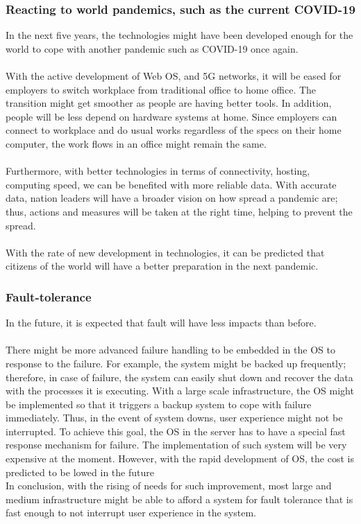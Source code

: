 \subsubsection{Reacting to world pandemics, such as the current COVID-19 }

In the next five years, the technologies might have been developed enough for the world to cope with another pandemic such as COVID-19 once again. \\
\\
With the active development of Web OS, and 5G networks, it will be eased for employers to switch workplace from traditional office to home office.
The transition might get smoother as people are having better tools.
In addition, people will be less depend on hardware systems at home. 
Since employers can connect to workplace and do usual works regardless of the specs on their home computer, the work flows in an office might remain the same. \\
\\
Furthermore, with better technologies in terms of connectivity, hosting, computing speed, we can be benefited with more reliable data. 
With accurate data, nation leaders will have a broader vision on how spread a pandemic are; thus, actions and measures will be taken at the right time, helping to prevent the spread. \\
\\
With the rate of new development in technologies, it can be predicted that citizens of the world will have a better preparation in the next pandemic.

\subsubsection{Fault-tolerance}

In the future, it is expected that fault will have less impacts than before. \\
\\
There might be more advanced failure handling to be embedded in the OS to response to the failure.
For example, the system might be backed up frequently; therefore, in case of failure, the system can easily shut down and recover the data with the processes it is executing.
With a large scale infrastructure, the OS might be implemented so that it triggers a backup system to cope with failure immediately.
Thus, in the event of system downs, user experience might not be interrupted. 
To achieve this goal, the OS in the server has to have a special fast response mechanism for failure.
The implementation of such system will be very expensive at the moment. 
However, with the rapid development of OS, the cost is predicted to be lowed in the future
\\
In conclusion, with the rising of needs for such improvement, most large and medium infrastructure might be able to afford a system for fault tolerance that is fast enough to not interrupt user experience in the system.

